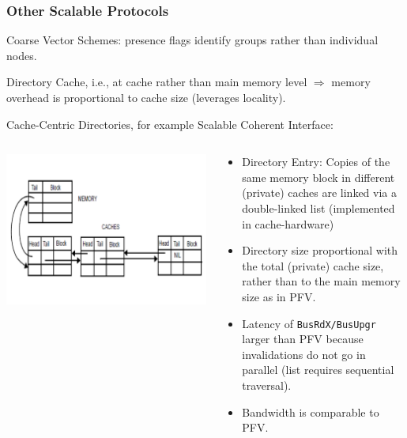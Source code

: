 \documentclass{beamer}
\renewcommand{\emph}[1]{\textcolor{structure}{#1}}
\newcommand{\emp}[1]{\textcolor{DikuRed}{ #1}}
\begin{document}
\begin{frame}[fragile,t]
\frametitle{Other Scalable Protocols}

\emp{Coarse Vector Schemes:} presence flags identify groups rather than individual nodes.
\smallskip

\emp{Directory Cache}, i.e., at cache rather than main memory level $\Rightarrow$
memory overhead is proportional to cache size (leverages locality).\medskip 

\emp{Cache-Centric Directories, for example Scalable Coherent Interface:}

\begin{columns}
\includegraphics[width=40ex]{FigsInfCoherence/CacheCentricProt}
\begin{scriptsize}
\begin{itemize}
    \item Directory Entry: Copies of the same memory block in different (private) 
            caches are linked via a double-linked list (implemented in cache-hardware)
    \item  \emph{Directory size proportional with the total (private) cache size},
            rather than to the main memory size as in PFV.
    \item \emp{Latency of {\tt BusRdX/BusUpgr} larger} than PFV because invalidations do not
            go in parallel (list requires sequential traversal).
    \item Bandwidth is comparable to PFV.
\end  {itemize}
\end{scriptsize}
\end{columns}

\end{frame}
\end{document}
